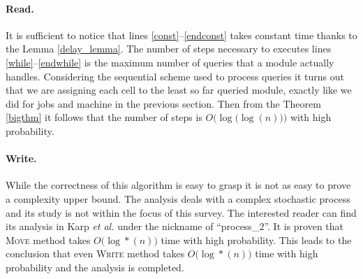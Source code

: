 \paragraph{{\bf Read}.} It is sufficient to notice that lines
\ref{const}--\ref{endconst} takes constant
time thanks to the Lemma \ref{delay_lemma}. The number of steps necessary to
executes lines \ref{while}--\ref{endwhile} is the maximum number of queries
that a module actually handles. Considering the sequential scheme used
to process queries it turns out that we are assigning each cell to the
least so far queried module, exactly like we did for jobs and machine in the previous section. Then from the Theorem \ref{bigthm} it follows that the
number of steps is $O\bigl(\log\bigl(\log(n)\bigl)\bigl)$ with high probability.

\paragraph{{\bf Write}.} While the correctness of this algorithm is easy to
grasp it is not as easy to prove a complexity upper bound. The analysis deals
with a complex stochastic process and its study is not within the focus of this
survey. The interested reader can find its analysis in Karp {\em et al.}
\cite{Karp} under the nickname of ``process\_2''. It is proven that
\textsc{Move} method takes $O\bigl(\log*(n)\bigr)$ time with high probability.
This leads to the conclusion that even \textsc{Write} method takes
$O\bigl(\log*(n)\bigr)$ time with high probability and the analysis is
completed.








